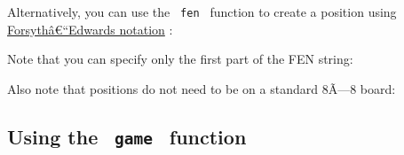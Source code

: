 Alternatively, you can use the \texttt{\ fen\ } function to create a
position using
\href{https://en.wikipedia.org/wiki/Forsyth\%E2\%80\%93Edwards_Notation}{Forsythâ€``Edwards
notation} :

\begin{Shaded}
\begin{Highlighting}[]
\end{Highlighting}
\end{Shaded}

\pandocbounded{}

Note that you can specify only the first part of the FEN string:

\begin{Shaded}
\begin{Highlighting}[]
\end{Highlighting}
\end{Shaded}

\pandocbounded{}

Also note that positions do not need to be on a standard 8Ã---8 board:

\begin{Shaded}
\begin{Highlighting}[]
\NormalTok{))}
\end{Highlighting}
\end{Shaded}

\pandocbounded{}

\subsection{\texorpdfstring{Using the \texttt{\ game\ }
function}{Using the  game  function}}\label{using-the-game-function}

